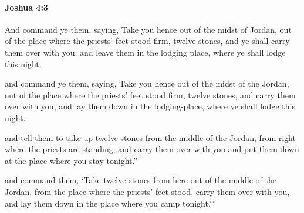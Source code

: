 		\paragraph{Joshua 4:3} %
			\label{JOSHUA-4-3}

			And command ye them, saying, Take you hence out of the midst of Jordan, out of the place where the priests’ feet stood firm, twelve stones, and ye shall carry them over with you, and leave them in the lodging place, where ye shall lodge this night.

			\begin{versebox}
					\item[BHS] 
					\item[ASV] and command ye them, saying, Take you hence out of the midst of the Jordan, out of the place where the priests' feet stood firm, twelve stones, and carry them over with you, and lay them down in the lodging-place, where ye shall lodge this night.
					\item[NIV] and tell them to take up twelve stones from the middle of the Jordan, from right where the priests are standing, and carry them over with you and put them down at the place where you stay tonight.”
					\item[NRSV] and command them, ‘Take twelve stones from here out of the middle of the Jordan, from the place where the priests’ feet stood, carry them over with you, and lay them down in the place where you camp tonight.’”
			\end{versebox}

